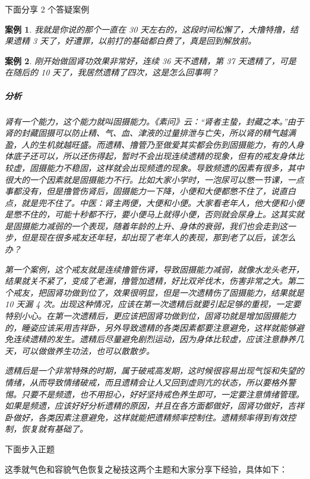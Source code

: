 \documentclass{ctexart}
\newtheorem{case}{案例}
\begin{document}
下面分享 2 个答疑案例

\begin{case}
    我就是你说的那个一直在 30 天左右的，这段时间松懈了，大撸特撸，结果遗精 3 天了，好遭罪，以前打的基础都白费了，真是回到解放前。
\end{case}

\begin{case}
    刚开始做固肾功效果非常好，连续 36 天不遗精，第 37 天遗精了，可是在随后的 10 天了，我居然遗精了四次，这是怎么回事啊？

    \subparagraph{分析} 肾有一个能力，这个能力就叫固摄能力。《素问》云：“肾者主蛰，封藏之本。”由于肾的封藏固摄可以防止精、气、血、津液的过量排泄与亡失，所以肾的精气越满盈，人的生机就越旺盛。而遗精、撸管乃至做爱其实都会伤到固摄能力，有的人身体底子还可以，所以还伤得起，暂时不会出现连续遗精的现象，但有的戒友身体比较虚，固摄能力不稳固，这样就会出现频遗的现象。导致频遗的因素有很多，其中很大的一个因素就是固摄能力不行。比如大家小学时，一泡尿可以憋一节课，一点事都没有，但是撸管伤肾后，固摄能力一下降，小便和大便都憋不住了，说直白点，就是兜不住了。中医：肾主两便，大便和小便。大家看老年人，他大便和小便是憋不住的，可能十秒都不行，要小便马上就得小便，否则就会尿身上。这其实就是固摄能力减弱的一个表现，随着年龄的上升、身体的衰弱，我们也会走到这一步，但是现在很多戒友还年轻，却出现了老年人的表现，那到老了以后，该怎么办？

    第一个案例，这个戒友就是连续撸管伤肾，导致固摄能力减弱，就像水龙头老开，结果就关不紧了，变成了老漏，撸管加遗精，好比双斧伐木，伤害非常之大。第二个戒友，把固肾功做到位了，效果很明显，但是一次遗精伤了固摄能力，结果就是 10 天漏 4 次。出现这种情况，应该在第一次遗精后就要引起足够的重视，一定要特别小心。在第一次遗精后，更应该把固肾功做到位，固肾功就是增加固摄能力的，睡姿应该采用吉祥卧，另外导致遗精的各类因素都要注意避免，这样就能够避免连续遗精的发生。遗精后尽量避免剧烈运动，因为身体比较虚，应该注意静养几天，可以做做养生功法，也可以散散步。

    遗精后是一个非常特殊的时期，属于破戒高发期，这时候很容易出现气馁和失望的情绪，从而导致情绪破戒，而且遗精会让人又回到虚则亢的状态，所以要格外警惕。只要不是频遗，也不用担心，好好坚持戒色养生即可，一定要注意情绪管理。如果是频遗，应该好好分析遗精的原因，并且在各方面都做好，固肾功做好，吉祥卧做好，各类因素注意避免，这样就能把遗精频率控制住。遗精频率得到有效控制，恢复就有基础了。
\end{case}

下面步入正题

这季就气色和容貌气色恢复之秘技这两个主题和大家分享下经验，具体如下：
\end{document}
